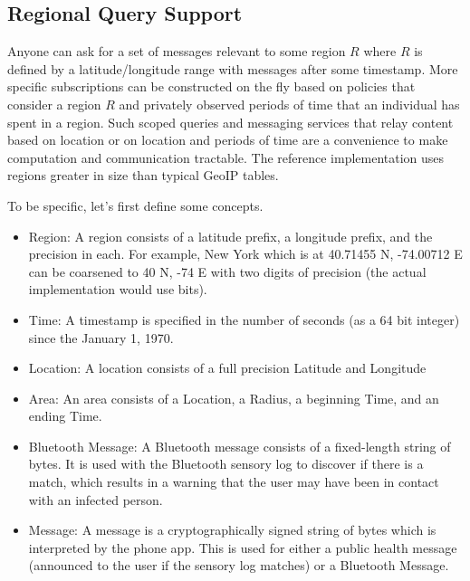 \documentclass{article}
\begin{document}
\subsection{Regional Query Support}
Anyone can ask for a set of messages relevant to some region $R$ where $R$ is defined by a latitude/longitude range with messages after some timestamp.  More specific subscriptions can be constructed on the fly based on policies that consider a region $R$ and privately observed periods of time that an individual has spent in a region. Such scoped queries and messaging services that relay content based on location or on location and periods of time are a convenience to make computation and communication tractable.  The reference implementation uses regions greater in size than typical GeoIP tables.

To be specific, let's first define some concepts.
\begin{itemize}
    \item Region: A region consists of a latitude prefix, a longitude prefix, and the precision in each.  For example, New York which is at 40.71455 N, -74.00712 E can be coarsened to 40 N, -74 E with two digits of precision (the actual implementation would use bits).
    \item Time: A timestamp is specified in the number of seconds (as a 64 bit integer) since the January 1, 1970. 
    \item Location: A location consists of a full precision Latitude and Longitude
    \item Area: An area consists of a Location, a Radius, a beginning Time, and an ending Time.
    \item Bluetooth Message: A Bluetooth message consists of a fixed-length string of bytes.  It is used with the Bluetooth sensory log to discover if there is a match, which results in a warning that the user may have been in contact with an infected person.  
    \item Message: A message is a cryptographically signed string of bytes which is interpreted by the phone app. This is used for either a public health message (announced to the user if the sensory log matches) or a Bluetooth Message. 
\end{itemize}
\end{document}
